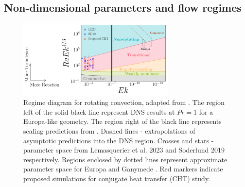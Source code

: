 \documentclass{article}
\begin{document}
\subsection{Non-dimensional parameters and flow regimes}
%	
\begin{figure}
	\begin{center}
		\includegraphics[width=0.7\textwidth]{figures/reg_diagram}
		\phantom{Lorem ipsum dolor sit amet}
	\end{center}
	\caption{Regime diagram for rotating convection, adapted from \citep{dL23,tG16}. The region left of the solid black line represent DNS results at $Pr = 1$ for a Europa-like geometry\citep{aB22}. The region right of the black line represents scaling predictions from \citep{tG16}. Dashed lines - extrapolations of asymptotic predictions into the DNS region. Crosses and stars - parameter space from Lemasquerier et al. 2023\citep{dL23} and Soderlund 2019\citep{kS19} respectively. Regions enclosed by dotted lines represent approximate parameter space for Europa and Ganymede \citep{dL23,kS19}. Red markers indicate proposed simulations for conjugate heat transfer (CHT) study.
	}
	\label{f:reg_d}
\end{figure}
\end{document}
